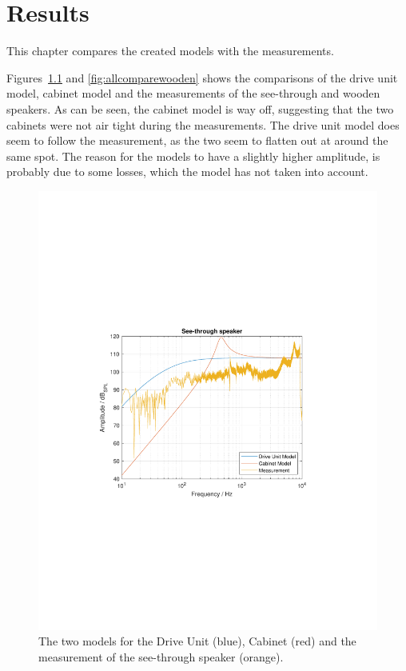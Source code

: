 
\chapter{Results}
\label{chap:results}
This chapter compares the created models with the measurements.

Figures~\ref{fig:allcompareseethrough} and \ref{fig:allcomparewooden} shows the comparisons of the drive unit model, cabinet model and the measurements of the see-through and wooden speakers.
As can be seen, the cabinet model is way off, suggesting that the two cabinets were not air tight during the measurements.
The drive unit model does seem to follow the measurement, as the two seem to flatten out at around the same spot.
The reason for the models to have a slightly higher amplitude, is probably due to some losses, which the model has not taken into account.


\begin{figure}
	\centering
	\includegraphics[width=0.7\linewidth, clip, trim={3.9cm 8.4cm 4.5cm 8.5cm}]{gfx/Results/AllCompareSeeThrough.pdf}
	\caption{The two models for the Drive Unit (blue), Cabinet (red) and the measurement of the see-through speaker (orange).}
	\label{fig:allcompareseethrough}
\end{figure}

